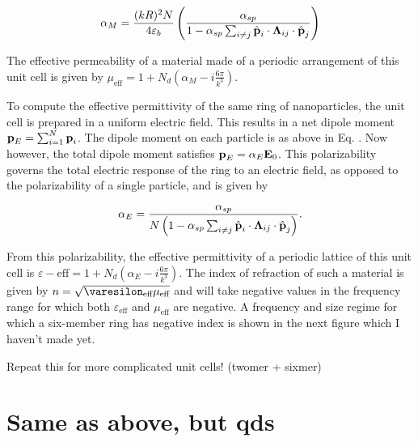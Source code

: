 \documentclass[journal=apchd5,manuscript=article]{achemso}
\begin{document}
\begin{equation}
\alpha_{M} = \frac{(kR)^{2}N}{4\varepsilon_{b}}\left(\frac{\alpha_{sp}}{1 - \alpha_{sp}\sum_{i\neq j}\hat{\textrm{\textbf{p}}}_{i} \cdot \boldsymbol{\Lambda}_{ij}\cdot\hat{\textrm{\textbf{p}}}_{j} }\right)
\label{alphaM}
\end{equation}

The effective permeability of a material made of a periodic arrangement of this unit cell is given by $\mu_{\textrm{eff}} = 1 + N_{d}\left(\alpha_{M} - i\frac{6\pi}{k^3}\right)$.

To compute the effective permittivity of the same ring of nanoparticles, the unit cell is prepared in a uniform electric field. This results in a net dipole moment $\textrm{\textbf{p}}_{E} = \sum_{i=1}^{N} \textrm{\textbf{p}}_{i}$. The dipole moment on each particle is as above in Eq. . Now however, the total dipole moment satisfies $\textrm{\textbf{p}}_{E} = \alpha_{E}\textrm{\textbf{E}}_{0}$. This polarizability governs the total electric response of the ring to an electric field, as opposed to the polarizability of a single particle, and is given by

\begin{equation}
\alpha_{E} = \frac{\alpha_{sp}}{N\left(1 - \alpha_{sp}\sum_{i\neq j}\hat{\textrm{\textbf{p}}}_{i} \cdot \boldsymbol{\Lambda}_{ij}\cdot\hat{\textrm{\textbf{p}}}_{j}\right)}.
\label{alphaE}
\end{equation}

From this polarizability, the effective permittivity of a periodic lattice of this unit cell is $\varepsilon-{\textrm{eff}} = 1 + N_{d}\left(\alpha_{E} - i\frac{6\pi}{k^3} \right)$. The index of refraction of such a material is given by $n = \sqrt{\varesilon_{\textrm{eff}}\mu_{\textrm{eff}}}$ and will take negative values in the frequency range for which both $\varepsilon_{\textrm{eff}}$ and $\mu_{\textrm{eff}}$ are negative. A frequency and size regime for which a six-member ring has negative index is shown in the next figure which I haven't made yet.

Repeat this for more complicated unit cells! (twomer + sixmer) 
\section{Same as above, but qds}
\end{document}
